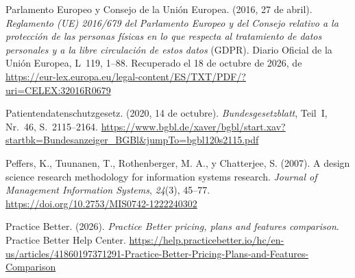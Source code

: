 \documentclass[12pt, a4paper]{article}
\begin{document}
\begin{list}{}{\setlength{\leftmargin}{1.27cm}\setlength{\itemindent}{-1.27cm}%
  \setlength{\labelwidth}{0pt}\setlength{\labelsep}{0pt}\setlength{\itemsep}{6pt}}

\item Parlamento Europeo y Consejo de la Unión Europea. (2016,
  27 de abril). \textit{Reglamento (UE) 2016/679 del Parlamento
  Europeo y del Consejo relativo a la protección de las personas
  físicas en lo que respecta al tratamiento de datos personales
  y a la libre circulación de estos datos} (GDPR).
  Diario Oficial de la Unión Europea, L~119, 1--88.
  Recuperado el 18 de octubre de 2026, de \url{https://eur-lex.europa.eu/legal-content/ES/TXT/PDF/?uri=CELEX:32016R0679}


\item Patientendatenschutzgesetz. (2020, 14 de octubre).
  \textit{Bundesgesetzblatt}, Teil~I, Nr.~46, S.~2115--2164.
  \url{https://www.bgbl.de/xaver/bgbl/start.xav?startbk=Bundesanzeiger_BGBl&jumpTo=bgbl120s2115.pdf}


\item Peffers, K., Tuunanen, T., Rothenberger, M. A., y
  Chatterjee, S. (2007). A design science research methodology
  for information systems research. \textit{Journal of Management
  Information Systems}, \textit{24}(3), 45--77.
  \url{https://doi.org/10.2753/MIS0742-1222240302}



\item Practice Better. (2026). \textit{Practice Better pricing, plans and
  features comparison}. Practice Better Help Center.
  \url{https://help.practicebetter.io/hc/en-us/articles/41860197371291-Practice-Better-Pricing-Plans-and-Features-Comparison}
 


\end{list}
\end{document}
